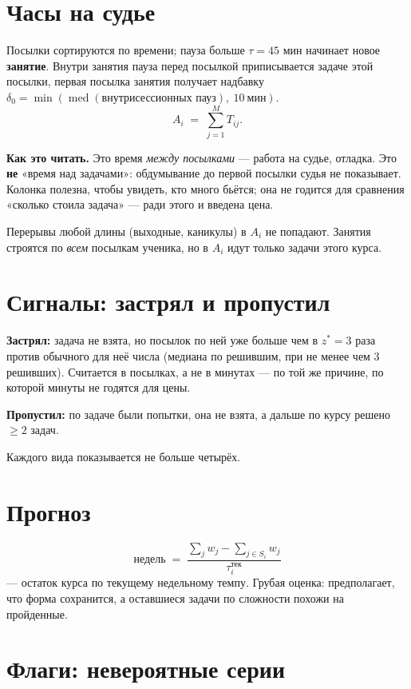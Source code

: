 \documentclass[11pt,a4paper]{article}
\newcommand{\med}{\operatorname{med}}
\begin{document}
\section{Часы на судье}

Посылки сортируются по времени; пауза больше $\tau = 45$ мин начинает новое
\textbf{занятие}. Внутри занятия пауза перед посылкой приписывается задаче этой
посылки, первая посылка занятия получает надбавку
$\delta_0 = \min(\med(\text{внутрисессионных пауз}),\ 10\ \text{мин})$.
\[
  A_i \;=\; \sum_{j=1}^{M} T_{ij}.
\]

\textbf{Как это читать.} Это время \emph{между посылками} --- работа на судье,
отладка. Это \textbf{не} «время над задачами»: обдумывание до первой посылки
судья не показывает. Колонка полезна, чтобы увидеть, кто много бьётся; она не
годится для сравнения «сколько стоила задача» --- ради этого и введена цена.

Перерывы любой длины (выходные, каникулы) в $A_i$ не попадают. Занятия строятся
по \emph{всем} посылкам ученика, но в $A_i$ идут только задачи этого курса.

\section{Сигналы: застрял и пропустил}

\textbf{Застрял:} задача не взята, но посылок по ней уже больше чем в
$z^{*} = 3$ раза против обычного для неё числа (медиана по решившим, при не
менее чем 3 решивших). Считается в посылках, а не в минутах --- по той же
причине, по которой минуты не годятся для цены.

\textbf{Пропустил:} по задаче были попытки, она не взята, а дальше по курсу
решено $\geq 2$ задач.

Каждого вида показывается не больше четырёх.

\section{Прогноз}

\[
  \text{недель} \;=\; \frac{\sum_j w_j - \sum_{j \in S_i} w_j}{\tau_i^{\text{тек}}}
\]
--- остаток курса по текущему недельному темпу. Грубая оценка: предполагает,
что форма сохранится, а оставшиеся задачи по сложности похожи на пройденные.

\section{Флаги: невероятные серии}
\label{sec:flags}
\end{document}
